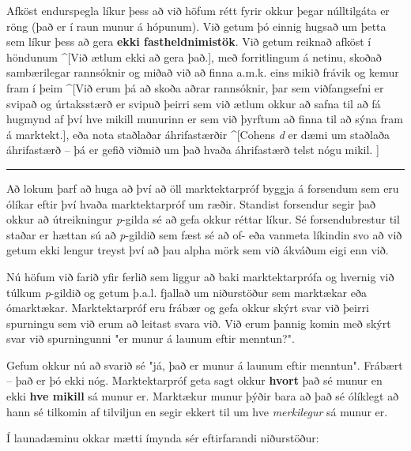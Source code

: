 \documentclass[
]{book}
\theoremstyle{definition}
\theoremstyle{definition}
\theoremstyle{definition}
\theoremstyle{definition}
\theoremstyle{remark}
\begin{document}
Afköst endurspegla líkur þess að við höfum rétt fyrir okkur þegar núlltilgáta er röng (það er í raun munur á hópunum). Við getum þó einnig hugsað um þetta sem líkur þess að gera \textbf{ekki fastheldnimistök}. Við getum reiknað afköst í höndunum \^{}{[}Við ætlum ekki að gera það.{]}, með forritlingum á netinu, skoðað sambærilegar rannsóknir og miðað við að finna a.m.k. eins mikið frávik og kemur fram í þeim \^{}{[}Við erum þá að skoða aðrar rannsóknir, þar sem viðfangsefni er svipað og úrtaksstærð er svipuð þeirri sem við ætlum okkur að safna til að fá hugmynd af því hve
mikill munurinn er sem við þyrftum að finna til að sýna fram á marktekt.{]}, eða nota staðlaðar áhrifastærðir \^{}{[}Cohens \emph{d} er dæmi um staðlaða áhrifastærð -- þá er gefið viðmið um það hvaða
áhrifastærð telst nógu mikil. {]}

\begin{center}\rule{0.5\linewidth}{0.5pt}\end{center}

Að lokum þarf að huga að því að öll marktektarpróf byggja á forsendum sem eru ólíkar eftir því hvaða marktektarpróf um ræðir. Standist forsendur segir það okkur að útreikningur \emph{p}-gilda sé að gefa okkur réttar líkur. Sé forsendubrestur til staðar er hættan sú að \emph{p}-gildið sem fæst sé að of-
eða vanmeta líkindin svo að við getum ekki lengur treyst því að þau alpha mörk sem við ákváðum eigi enn við.

Nú höfum við farið yfir ferlið sem liggur að baki marktektarprófa og hvernig við túlkum \emph{p}-gildið og getum þ.a.l. fjallað um niðurstöður sem marktækar eða ómarktækar. Marktektarpróf eru frábær og gefa okkur skýrt svar við þeirri spurningu sem við erum að leitast svara við. Við erum þannig komin með skýrt svar við spurningunni "er munur á launum eftir menntun?".

Gefum okkur nú að svarið sé "já, það er munur á launum eftir menntun". Frábært -- það er þó ekki nóg. Marktektarpróf geta sagt okkur \textbf{hvort} það sé munur en ekki \textbf{hve mikill} sá munur er. Marktækur munur þýðir bara að það sé ólíklegt að hann sé tilkomin af tilviljun en segir ekkert til um hve \emph{merkilegur} sá munur er.

Í launadæminu okkar mætti ímynda sér eftirfarandi niðurstöður:
\end{document}
